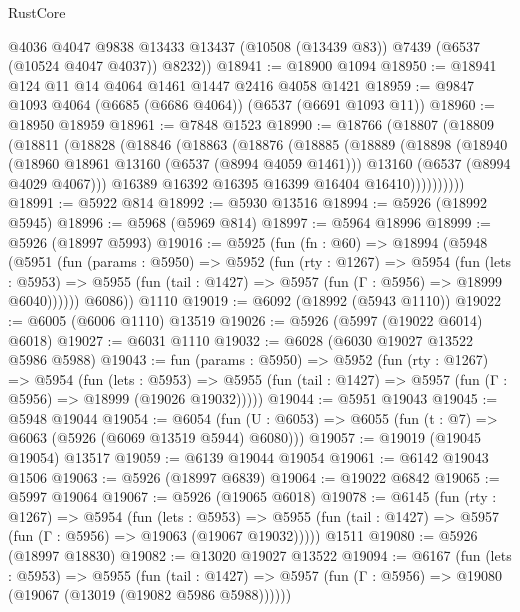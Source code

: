 \begin{lexlean}{RustCore}
\begin{coremodule}
        @4036
        @4047
        @9838
        @13433
        @13437
        (@10508 (@13439 @83))
        @7439
        (@6537 (@10524 @4047 @4037))
        @8232))
@18941 := @18900 @1094
@18950 := @18941 @124 @11 @14 @4064 @1461 @1447 @2416 @4058 @1421
@18959 := @9847 @1093 @4064 (@6685 (@6686 @4064)) (@6537 (@6691 @1093 @11))
@18960 := @18950 @18959
@18961 := @7848 @1523
@18990 := @18766
    (@18807
      (@18809
        (@18811
          (@18828
            (@18846
              (@18863
                (@18876
                  (@18885
                    (@18889
                      (@18898
                        (@18940
                          (@18960 @18961 @13160 (@6537 (@8994 @4059 @1461)))
                          @13160
                          (@6537 (@8994 @4029 @4067)))
                        @16389
                        @16392
                        @16395
                        @16399
                        @16404
                        @16410))))))))))
@18991 := @5922 @814
@18992 := @5930 @13516
@18994 := @5926 (@18992 @5945)
@18996 := @5968 (@5969 @814)
@18997 := @5964 @18996
@18999 := @5926 (@18997 @5993)
@19016 := @5925
    (fun (fn : @60) =>
    @18994
      (@5948
        (@5951
          (fun (params : @5950) =>
          @5952
            (fun (rty : @1267) =>
            @5954
              (fun (lets : @5953) =>
              @5955 (fun (tail : @1427) => @5957 (fun (Γ : @5956) => @18999 @6040))))))
        @6086))
    @1110
@19019 := @6092 (@18992 (@5943 @1110))
@19022 := @6005 (@6006 @1110) @13519
@19026 := @5926 (@5997 (@19022 @6014) @6018)
@19027 := @6031 @1110
@19032 := @6028 (@6030 @19027 @13522 @5986 @5988)
@19043 := fun (params : @5950) =>
  @5952
    (fun (rty : @1267) =>
    @5954
      (fun (lets : @5953) =>
      @5955 (fun (tail : @1427) => @5957 (fun (Γ : @5956) => @18999 (@19026 @19032)))))
@19044 := @5951 @19043
@19045 := @5948 @19044
@19054 := @6054
    (fun (U : @6053) => @6055 (fun (t : @7) => @6063 (@5926 (@6069 @13519 @5944) @6080)))
@19057 := @19019 (@19045 @19054) @13517
@19059 := @6139 @19044 @19054
@19061 := @6142 @19043 @1506
@19063 := @5926 (@18997 @6839)
@19064 := @19022 @6842
@19065 := @5997 @19064
@19067 := @5926 (@19065 @6018)
@19078 := @6145
    (fun (rty : @1267) =>
    @5954
      (fun (lets : @5953) =>
      @5955 (fun (tail : @1427) => @5957 (fun (Γ : @5956) => @19063 (@19067 @19032)))))
    @1511
@19080 := @5926 (@18997 @18830)
@19082 := @13020 @19027 @13522
@19094 := @6167
    (fun (lets : @5953) =>
    @5955
      (fun (tail : @1427) =>
      @5957 (fun (Γ : @5956) => @19080 (@19067 (@13019 (@19082 @5986 @5988))))))

\end{coremodule}
\end{lexlean}
